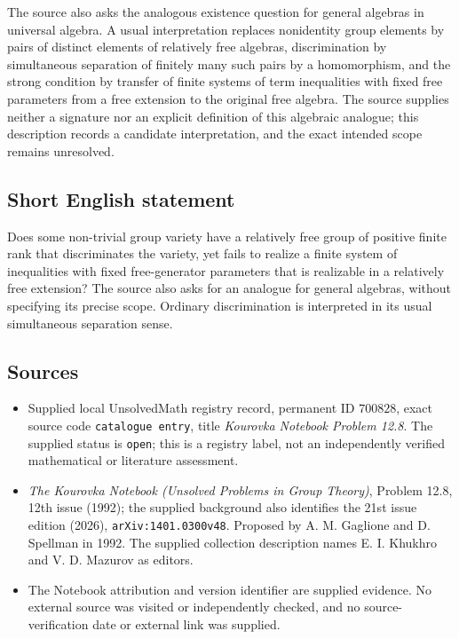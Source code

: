 \documentclass[11pt]{article}
\begin{document}
The source also asks the analogous existence question for general algebras in universal algebra. A usual interpretation replaces nonidentity group elements by pairs of distinct elements of relatively free algebras, discrimination by simultaneous separation of finitely many such pairs by a homomorphism, and the strong condition by transfer of finite systems of term inequalities with fixed free parameters from a free extension to the original free algebra. The source supplies neither a signature nor an explicit definition of this algebraic analogue; this description records a candidate interpretation, and the exact intended scope remains unresolved.
\subsection{Short English statement}
Does some non-trivial group variety have a relatively free group of positive finite rank that discriminates the variety, yet fails to realize a finite system of inequalities with fixed free-generator parameters that is realizable in a relatively free extension? The source also asks for an analogue for general algebras, without specifying its precise scope. Ordinary discrimination is interpreted in its usual simultaneous separation sense.
\subsection{Sources}
\begin{itemize}
\item Supplied local UnsolvedMath registry record, permanent ID \(700828\), exact source code \texttt{catalogue entry}, title \emph{Kourovka Notebook Problem 12.8}. The supplied status is \texttt{open}; this is a registry label, not an independently verified mathematical or literature assessment.
\item \emph{The Kourovka Notebook (Unsolved Problems in Group Theory)}, Problem 12.8, 12th issue (1992); the supplied background also identifies the 21st issue edition (2026), \texttt{arXiv:1401.0300v48}. Proposed by A. M. Gaglione and D. Spellman in 1992. The supplied collection description names E. I. Khukhro and V. D. Mazurov as editors.
\item The Notebook attribution and version identifier are supplied evidence. No external source was visited or independently checked, and no source-verification date or external link was supplied.
\end{itemize}
\end{document}
